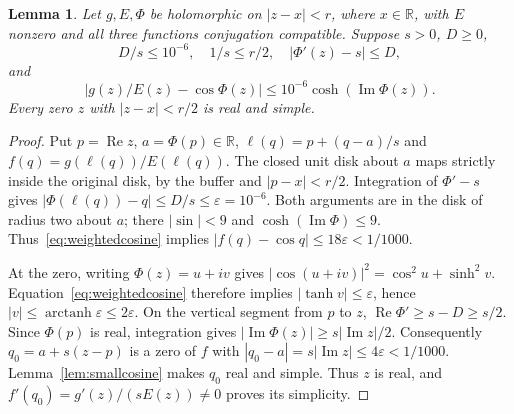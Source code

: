 \documentclass[11pt]{article}
\newtheorem{lemma}[theorem]{Lemma}
\theoremstyle{remark}\newtheorem{remark}[theorem]{Remark}
\newcommand{\R}{\mathbb R}\newcommand{\C}{\mathbb C}
\DeclareMathOperator{\Rea}{Re}\DeclareMathOperator{\Ima}{Im}
\begin{document}
\begin{lemma}\label{lem:straighten}
Let $g,E,\Phi$ be holomorphic on $|z-x|<r$, where $x\in\R$,
with $E$ nonzero and all three functions conjugation compatible.
Suppose $s>0$, $D\geq0$,
\[
 D/s\leq10^{-6},\quad 1/s\leq r/2,\quad
 |\Phi'(z)-s|\leq D,
\]
and
\begin{equation}\label{eq:weightedcosine}
 |g(z)/E(z)-\cos\Phi(z)|\leq10^{-6}\cosh(\Ima\Phi(z)).
\end{equation}
Every zero $z$ with $|z-x|<r/2$ is real and simple.
\end{lemma}
\begin{proof}
Put $p=\Rea z$, $a=\Phi(p)\in\R$,
$\ell(q)=p+(q-a)/s$ and $f(q)=g(\ell(q))/E(\ell(q))$.
The closed unit disk about $a$ maps strictly inside the
original disk, by the buffer and $|p-x|<r/2$.
Integration of $\Phi'-s$ gives
$|\Phi(\ell(q))-q|\leq D/s\leq\varepsilon=10^{-6}$.
Both arguments are in the disk of radius two about $a$;
there $|\sin|<9$ and $\cosh(\Ima\Phi)\leq9$.
Thus~\eqref{eq:weightedcosine} implies
$|f(q)-\cos q|\leq18\varepsilon<1/1000$.

At the zero, writing $\Phi(z)=u+iv$ gives
$|\cos(u+iv)|^2=\cos^2u+\sinh^2v$.
Equation~\eqref{eq:weightedcosine} therefore implies
$|\tanh v|\leq\varepsilon$, hence
$|v|\leq\operatorname{arctanh}\varepsilon\leq2\varepsilon$.
On the vertical segment from $p$ to $z$,
$\Rea\Phi'\geq s-D\geq s/2$. Since $\Phi(p)$ is real,
integration gives $|\Ima\Phi(z)|\geq s|\Ima z|/2$.
Consequently $q_0=a+s(z-p)$ is a zero of $f$ with
$|q_0-a|=s|\Ima z|\leq4\varepsilon<1/1000$.
Lemma~\ref{lem:smallcosine} makes $q_0$ real and simple.
Thus $z$ is real, and
$f'(q_0)=g'(z)/(sE(z))\ne0$ proves its simplicity.
\end{proof}
\end{document}
